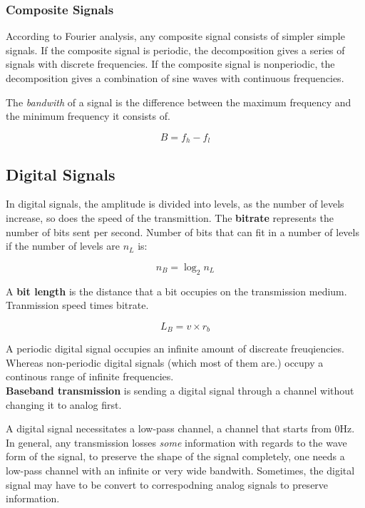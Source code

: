 \documentclass[11pt,a4paper,twoside]{book}
\begin{document}
\subsubsection{Composite Signals}

According to Fourier analysis, any composite signal consists of simpler simple signals. If the composite signal is periodic, the decomposition gives a series of signals with discrete frequencies. If the composite signal is nonperiodic, the decomposition gives a combination of sine waves with continuous frequencies.

The \textit{bandwith} of a signal is the difference between the maximum frequency and the minimum frequency it consists of.

\begin{equation}
B = f_h - f_l
\end{equation}

\subsection{Digital Signals}

In digital signals, the amplitude is divided into levels, as the number of levels increase, so does the speed of the transmittion. The \textbf{bitrate} represents the number of bits sent per second. Number of bits that can fit in a number of levels if the number of levels are $n_L$ is:

\begin{equation}
n_B = \log_2 n_L 
\end{equation}

A \textbf{bit length} is the distance that a bit occupies on the transmission medium. Tranmission speed times bitrate.

\begin{equation}
L_B = v \times r_b
\end{equation}

A periodic digital signal occupies an infinite amount of discreate freuqiencies. Whereas non-periodic digital signals (which most of them are.) occupy a continous range of infinite frequencies.\\

\textbf{Baseband transmission} is sending a digital signal through a channel without changing it to analog first.

A digital signal necessitates a low-pass channel, a channel that starts from 0Hz.\\

In general, any transmission losses \textit{some} information with regards to the wave form of the signal, to preserve the shape of the signal completely, one needs a low-pass channel with an infinite or very wide bandwith. Sometimes, the digital signal may have to be convert to correspodning analog signals to preserve information.\\
\end{document}
